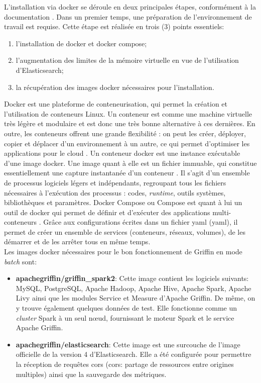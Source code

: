 L'installation via docker se d\'eroule en deux principales \'etapes, conform\'ement \`a la documentation \cite{ApacheGriffinDocDocker}. Dans un premier temps, une pr\'eparation de l'environnement de travail est requise. Cette \'etape est r\'ealis\'ee en trois (3) points essentiels: 
\begin{enumerate}[parsep=0cm,itemsep=0cm]
\item l'installation de docker et docker compose;
\item l'augmentation des limites de la m\'emoire virtuelle en vue de l'utilisation d'Elasticsearch;
\item la r\'ecup\'eration des images docker n\'ecessaires pour l'installation.
\end{enumerate}
\vspace{0.15cm}

Docker est une plateforme de conteneurisation, qui permet la création et l'utilisation de conteneurs Linux. Un conteneur est comme une machine virtuelle très légère et modulaire et est donc une tr\`es bonne alternative \`a ces derni\`eres. En outre, les conteneurs offrent une grande flexibilité : on peut les créer, déployer, copier et déplacer d'un environnement à un autre, ce qui permet d'optimiser les applications pour le cloud \cite{RedHatDocker}. Un conteneur docker est une instance exécutable d’une image docker. Une image quant \`a elle est un fichier immuable, qui constitue essentiellement une capture instantanée d’un conteneur \cite{WayToLearnX_docker}. Il s’agit d’un ensemble de processus logiciels légers et indépendants, regroupant tous les fichiers nécessaires à l’exécution des processus : codes, \textit{runtime}, outils systèmes, bibliothèques et paramètres. Docker Compose ou Compose est quant \`a lui un outil de docker qui permet de d\'efinir et d'ex\'ecuter des applications multi-conteneurs \cite{Dockerdoc}. Gr\^ace aux configurations \'ecrites dans un fichier \acrshort{yaml} (\acrlong{yaml}), il permet de cr\'eer un ensemble de services (conteneurs, r\'eseaux, volumes), de les d\'emarrer et de les arr\^eter tous en m\^eme temps.
\\

Les images docker n\'ecessaires pour le bon fonctionnement de Griffin en mode \textit{batch} sont: 
\begin{itemize}[parsep=0cm,itemsep=0cm]
\item \textbf{apachegriffin/griffin\_spark2}:  Cette image contient les logiciels suivants:  MySQL, PostgreSQL, Apache Hadoop, Apache Hive, Apache Spark, Apache Livy ainsi que les modules Service et Measure d'Apache Griffin. De m\^eme, on y trouve \'egalement  quelques données de test. Elle fonctionne comme un \textit{cluster} Spark à un seul nœud, fournissant le moteur Spark et le service Apache Griffin.
\item \textbf{apachegriffin/elasticsearch}: Cette image est une surcouche de l'image officielle de la version 4 d'Elasticsearch. Elle a \'et\'e configur\'ee pour permettre la r\'eception de requêtes \acrshort{cors} (\acrlong{cors}: partage de ressources entre origines multiples) ainsi que la sauvegarde des métriques.
\end{itemize}

